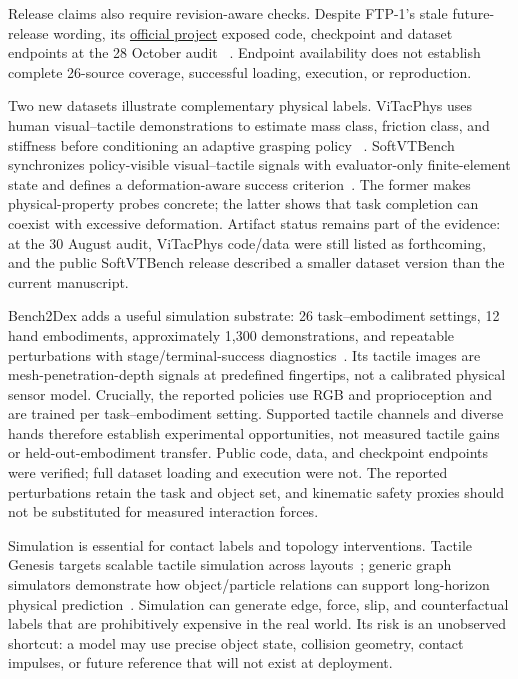 Release claims also require revision-aware checks. Despite FTP-1's stale
future-release wording, its \href{https://ftp1-policy.github.io/}{official project}
exposed code, checkpoint and dataset endpoints at the 28 October audit
~\cite{yuan2026ftp1}. Endpoint availability does not establish complete
26-source coverage, successful loading, execution, or reproduction.

Two new datasets illustrate complementary physical labels. ViTacPhys uses human
visual--tactile demonstrations to estimate mass class, friction class, and
stiffness before conditioning an adaptive grasping policy
~\cite{liu2026vitacphys}. SoftVTBench synchronizes policy-visible visual--tactile
signals with evaluator-only finite-element state and defines a deformation-aware
success criterion~\cite{jing2026softvtbench}. The former makes physical-property
probes concrete; the latter shows that task completion can coexist with excessive
deformation. Artifact status remains part of the evidence: at the 30 August audit,
ViTacPhys code/data were still listed as forthcoming, and the public SoftVTBench
release described a smaller dataset version than the current manuscript.

Bench2Dex adds a useful simulation substrate: 26 task--embodiment settings,
12 hand embodiments, approximately 1,300 demonstrations, and repeatable
perturbations with stage/terminal-success diagnostics~\cite{yang2026bench2dex}.
Its tactile images are mesh-penetration-depth signals at predefined fingertips,
not a calibrated physical sensor model. Crucially, the reported policies use RGB
and proprioception and are trained per task--embodiment setting. Supported tactile
channels and diverse hands therefore establish experimental opportunities, not
measured tactile gains or held-out-embodiment transfer. Public code, data, and
checkpoint endpoints were verified; full dataset loading and execution were not.
The reported perturbations retain the task and object set, and kinematic safety
proxies should not be substituted for measured interaction forces.

Simulation is essential for contact labels and topology interventions. Tactile
Genesis targets scalable tactile simulation across layouts~\cite{chung2026tactilegenesis};
generic graph simulators demonstrate how object/particle relations can support
long-horizon physical prediction~\cite{sanchez2020gns,allen2022contact}. Simulation
can generate edge, force, slip, and counterfactual labels that are prohibitively
expensive in the real world. Its risk is an unobserved shortcut: a model may use
precise object state, collision geometry, contact impulses, or future reference
that will not exist at deployment.

